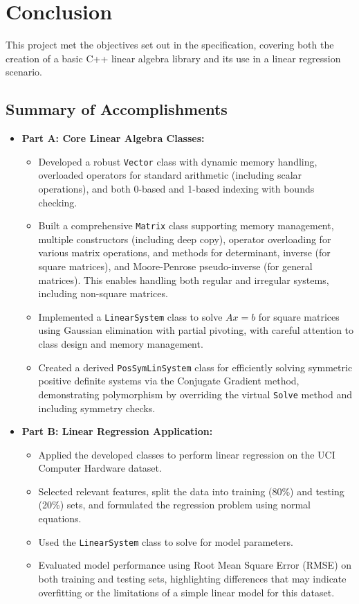 \chapter{Conclusion}
\label{chap:conclusion}

This project met the objectives set out in the specification, covering both the creation of a basic C++ linear algebra library and its use in a linear regression scenario.

\section{Summary of Accomplishments}
\begin{itemize}
    \item \textbf{Part A: Core Linear Algebra Classes:}
    \begin{itemize}
        \item Developed a robust \texttt{Vector} class with dynamic memory handling, overloaded operators for standard arithmetic (including scalar operations), and both 0-based and 1-based indexing with bounds checking.
        \item Built a comprehensive \texttt{Matrix} class supporting memory management, multiple constructors (including deep copy), operator overloading for various matrix operations, and methods for determinant, inverse (for square matrices), and Moore-Penrose pseudo-inverse (for general matrices). This enables handling both regular and irregular systems, including non-square matrices.
        \item Implemented a \texttt{LinearSystem} class to solve $Ax=b$ for square matrices using Gaussian elimination with partial pivoting, with careful attention to class design and memory management.
        \item Created a derived \texttt{PosSymLinSystem} class for efficiently solving symmetric positive definite systems via the Conjugate Gradient method, demonstrating polymorphism by overriding the virtual \texttt{Solve} method and including symmetry checks.
    \end{itemize}
    \item \textbf{Part B: Linear Regression Application:}
    \begin{itemize}
        \item Applied the developed classes to perform linear regression on the UCI Computer Hardware dataset.
        \item Selected relevant features, split the data into training (80\%) and testing (20\%) sets, and formulated the regression problem using normal equations.
        \item Used the \texttt{LinearSystem} class to solve for model parameters.
        \item Evaluated model performance using Root Mean Square Error (RMSE) on both training and testing sets, highlighting differences that may indicate overfitting or the limitations of a simple linear model for this dataset.
    \end{itemize}
\end{itemize}


